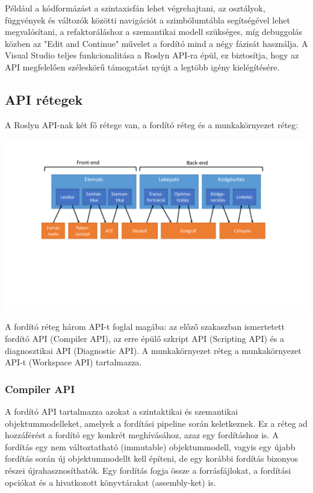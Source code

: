 \documentclass[12pt, a4paper]{report}
\begin{document}
Például a kódformázást a szintaxisfán lehet végrehajtani, az osztályok, függvények és változók közötti navigációt a szimbólumtábla segítségével lehet megvalósítani, a refaktoráláshoz a szemantikai modell szükséges, míg debuggolás közben az "Edit and Continue" művelet a fordító mind a négy fázisát használja. A Visual Studio teljes funkcionalitása a Roslyn API-ra épül, ez biztosítja, hogy az API megfelelően széleskörű támogatást nyújt a legtöbb igény kielégítésére.

\subsection{API rétegek}

A Roslyn API-nak két fő rétege van, a fordító réteg és a munkakörnyezet réteg:

\begin{center}\includegraphics[trim=100 180 150 110,clip,width=\textwidth,page=4]{Images.pdf}\end{center}

A fordító réteg három API-t foglal magába: az előző szakaszban ismertetett fordító API (Compiler API), az erre épülő szkript API (Scripting API) és a diagnosztikai API (Diagnostic API). A munkakörnyezet réteg a munkakörnyezet API-t (Workspace API) tartalmazza.

\subsubsection{Compiler API}

A fordító API tartalmazza azokat a szintaktikai és szemantikai objektummodelleket, amelyek a fordítási pipeline során keletkeznek. Ez a réteg ad hozzáférést a fordító egy konkrét meghívásához, azaz egy fordításhoz is. A fordítás egy nem változtatható (immutable) objektummodell, vagyis egy újabb fordítás során új objektummodellt kell építeni, de egy korábbi fordítás bizonyos részei újrahasznosíthatók. Egy fordítás fogja össze a forrásfájlokat, a fordítási opciókat és a hivatkozott könyvtárakat (assembly-ket) is.
\end{document}
